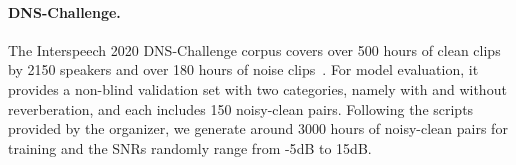 \documentclass{article}
\begin{document}
{\paragraph{DNS-Challenge.} The Interspeech 2020 DNS-Challenge corpus covers over 500 hours of clean clips by 2150 speakers and over 180 hours of noise clips~{\cite{reddy2020interspeech}}. For model evaluation, it provides a non-blind validation set with two categories, namely with and without reverberation, and each includes 150 noisy-clean pairs. Following the scripts provided by the organizer, we generate around 3000 hours of noisy-clean pairs for training and the SNRs randomly range from -5\rm{dB} to 15\rm{dB}.
\renewcommand\arraystretch{0.90}
\begin{table}[t]
	\Huge
	\centering
\end{table}}
\end{document}
